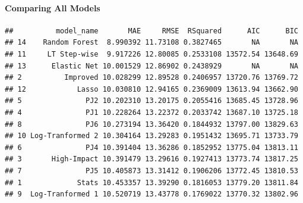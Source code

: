 \documentclass[
]{article}
\newenvironment{Shaded}{\begin{snugshade}}{\end{snugshade}}
\newcommand{\CommentTok}[1]{\textcolor[rgb]{0.56,0.35,0.01}{\textit{#1}}}
\newcommand{\FunctionTok}[1]{\textcolor[rgb]{0.13,0.29,0.53}{\textbf{#1}}}
\newcommand{\NormalTok}[1]{#1}
\newcommand{\OtherTok}[1]{\textcolor[rgb]{0.56,0.35,0.01}{#1}}
\newcommand{\SpecialCharTok}[1]{\textcolor[rgb]{0.81,0.36,0.00}{\textbf{#1}}}
\newcommand{\StringTok}[1]{\textcolor[rgb]{0.31,0.60,0.02}{#1}}
\begin{document}
\begin{Shaded}
\end{Shaded}

\paragraph{Comparing All Models}\label{comparing-all-models}

\begin{Shaded}
\end{Shaded}

\begin{verbatim}
##          model_name       MAE     RMSE  RSquared      AIC      BIC
## 14    Random Forest  8.990392 11.73108 0.3827465       NA       NA
## 11     LT Step-wise  9.917226 12.80085 0.2533108 13572.54 13648.69
## 13      Elastic Net 10.001529 12.86902 0.2438929       NA       NA
## 2          Improved 10.028299 12.89528 0.2406957 13720.76 13769.72
## 12            Lasso 10.030810 12.94165 0.2369009 13613.94 13662.90
## 5               PJ2 10.202310 13.20175 0.2055416 13685.45 13728.96
## 4               PJ1 10.228264 13.22372 0.2033742 13687.10 13725.18
## 8               PJ6 10.273194 13.36420 0.1844932 13797.00 13829.63
## 10 Log-Tranformed 2 10.304164 13.29283 0.1951432 13695.71 13733.79
## 6               PJ4 10.391404 13.36286 0.1852952 13775.04 13813.11
## 3       High-Impact 10.391479 13.29616 0.1927413 13773.74 13817.25
## 7               PJ5 10.405873 13.31412 0.1906206 13772.45 13810.53
## 1             Stats 10.453357 13.39290 0.1816053 13779.20 13811.84
## 9  Log-Tranformed 1 10.520719 13.43778 0.1769022 13770.32 13802.96
\end{verbatim}
\end{document}
